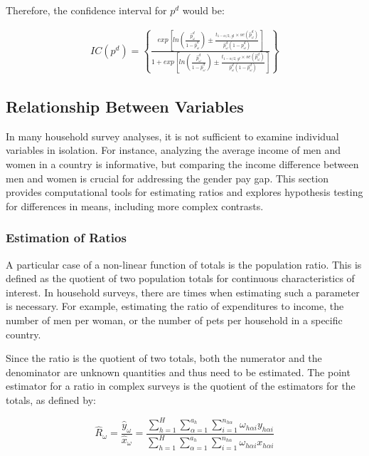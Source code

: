 \documentclass[
  12pt,
]{book}
\begin{document}
Therefore, the confidence interval for \(p^d\) would be:

\begin{eqnarray}
IC\left(p^d\right)  =  \left\{ \frac{exp\left[ln\left(\frac{\hat{p}_{\omega}^d}{1-\hat{p}_{\omega}^d}\right)\pm\frac{t_{1-\alpha/2,\,gl}\times se\left(\hat{p}_{\omega}^d\right)}{\hat{p}_{\omega}^d\left(1-\hat{p}_{\omega}^d\right)}\right]}{1+exp\left[ln\left(\frac{\hat{p}_{\omega}^d}{1-\hat{p}_{\omega}^d}\right)\pm\frac{t_{1-\alpha/2,\,gl}\times se\left(\hat{p}_{\omega}^d\right)}{\hat{p}_{\omega}^d\left(1-\hat{p}_{\omega}^d\right)}\right]}\right\} 
\end{eqnarray}

\hypertarget{relationship-between-variables}{%
\subsection{Relationship Between Variables}\label{relationship-between-variables}}

In many household survey analyses, it is not sufficient to examine individual variables in isolation. For instance, analyzing the average income of men and women in a country is informative, but comparing the income difference between men and women is crucial for addressing the gender pay gap. This section provides computational tools for estimating ratios and explores hypothesis testing for differences in means, including more complex contrasts.

\hypertarget{estimation-of-ratios}{%
\subsubsection{Estimation of Ratios}\label{estimation-of-ratios}}

A particular case of a non-linear function of totals is the population ratio. This is defined as the quotient of two population totals for continuous characteristics of interest. In household surveys, there are times when estimating such a parameter is necessary. For example, estimating the ratio of expenditures to income, the number of men per woman, or the number of pets per household in a specific country.

Since the ratio is the quotient of two totals, both the numerator and the denominator are unknown quantities and thus need to be estimated. The point estimator for a ratio in complex surveys is the quotient of the estimators for the totals, as defined by:

\[
\hat{R}_{\omega} = \frac{\hat{y}_{\omega}}{\hat{x}_{\omega}}
= \frac{\sum_{h=1}^{H}\sum_{\alpha=1}^{a_{h}}\sum_{i=1}^{n_{h\alpha}}\omega_{h\alpha i}y_{h\alpha i}}{\sum_{h=1}^{H}\sum_{\alpha=1}^{a_{h}}\sum_{i=1}^{n_{h\alpha}}\omega_{h\alpha i}x_{h\alpha i}}
\]
\end{document}
